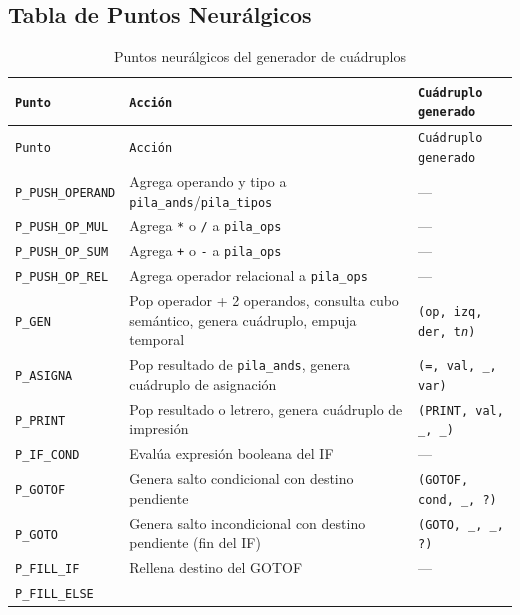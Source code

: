 \documentclass[12pt, letterpaper]{article}
\theoremstyle{definition}
\begin{document}
\subsection{Tabla de Puntos Neurálgicos}

\begin{longtable}{|p{4.2cm}|p{5cm}|p{5.5cm}|}
    \caption{Puntos neurálgicos del generador de cuádruplos} \\
    \hline
    \texttt{Punto} & \texttt{Acción} & \texttt{Cuádruplo generado} \\
    \hline
    \endfirsthead
    \hline
    \texttt{Punto} & \texttt{Acción} & \texttt{Cuádruplo generado} \\
    \hline
    \endhead
    \hline
    \endfoot
    \hline
    \endlastfoot
    \texttt{P\_PUSH\_OPERAND} &
    Agrega operando y tipo a \texttt{pila\_ands}/\texttt{pila\_tipos} &
    --- \\ \hline
    \texttt{P\_PUSH\_OP\_MUL} &
    Agrega \texttt{*} o \texttt{/} a \texttt{pila\_ops} &
    --- \\ \hline
    \texttt{P\_PUSH\_OP\_SUM} &
    Agrega \texttt{+} o \texttt{-} a \texttt{pila\_ops} &
    --- \\ \hline
    \texttt{P\_PUSH\_OP\_REL} &
    Agrega operador relacional a \texttt{pila\_ops} &
    --- \\ \hline
    \texttt{P\_GEN} &
    Pop operador + 2 operandos, consulta cubo semántico, genera cuádruplo, empuja temporal &
    \texttt{(op, izq, der, t\textit{n})} \\ \hline
    \texttt{P\_ASIGNA} &
    Pop resultado de \texttt{pila\_ands}, genera cuádruplo de asignación &
    \texttt{(=, val, \_, var)} \\ \hline
    \texttt{P\_PRINT} &
    Pop resultado o letrero, genera cuádruplo de impresión &
    \texttt{(PRINT, val, \_, \_)} \\ \hline
    \texttt{P\_IF\_COND} &
    Evalúa expresión booleana del IF &
    --- \\ \hline
    \texttt{P\_GOTOF} &
    Genera salto condicional con destino pendiente &
    \texttt{(GOTOF, cond, \_, ?)} \\ \hline
    \texttt{P\_GOTO} &
    Genera salto incondicional con destino pendiente (fin del IF) &
    \texttt{(GOTO, \_, \_, ?)} \\ \hline
    \texttt{P\_FILL\_IF} &
    Rellena destino del GOTOF &
    --- \\ \hline
    \texttt{P\_FILL\_ELSE} &

\end{longtable}
\end{document}
